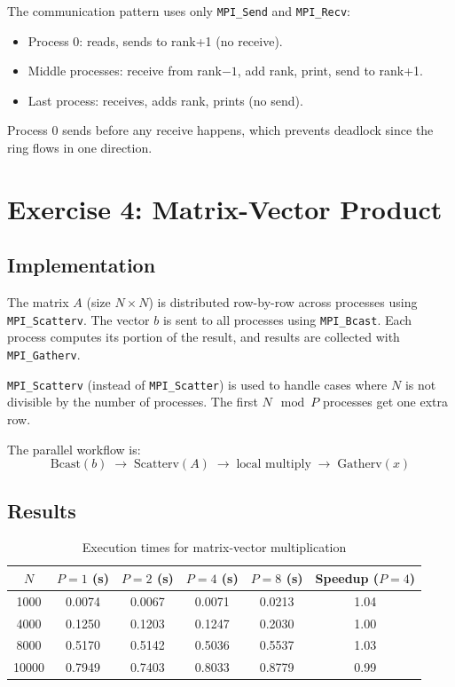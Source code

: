 \documentclass[11pt,a4paper]{article}
\begin{document}
The communication pattern uses only \texttt{MPI\_Send} and \texttt{MPI\_Recv}:
\begin{itemize}
    \item Process 0: reads, sends to rank+1 (no receive).
    \item Middle processes: receive from rank$-1$, add rank, print, send to rank+1.
    \item Last process: receives, adds rank, prints (no send).
\end{itemize}

Process 0 sends before any receive happens, which prevents deadlock since the ring flows in one direction.

\section{Exercise 4: Matrix-Vector Product}

\subsection{Implementation}

The matrix $A$ (size $N \times N$) is distributed row-by-row across processes using \texttt{MPI\_Scatterv}. The vector $b$ is sent to all processes using \texttt{MPI\_Bcast}. Each process computes its portion of the result, and results are collected with \texttt{MPI\_Gatherv}.

\texttt{MPI\_Scatterv} (instead of \texttt{MPI\_Scatter}) is used to handle cases where $N$ is not divisible by the number of processes. The first $N \mod P$ processes get one extra row.

The parallel workflow is:
\[
\text{Bcast}(b) \;\rightarrow\; \text{Scatterv}(A) \;\rightarrow\; \text{local multiply} \;\rightarrow\; \text{Gatherv}(x)
\]

\subsection{Results}

\begin{table}[h]
\centering
\begin{tabular}{cccccc}
\toprule
$N$ & $P=1$ (s) & $P=2$ (s) & $P=4$ (s) & $P=8$ (s) & Speedup ($P=4$) \\
\midrule
1000  & 0.0074 & 0.0067 & 0.0071 & 0.0213 & 1.04 \\
4000  & 0.1250 & 0.1203 & 0.1247 & 0.2030 & 1.00 \\
8000  & 0.5170 & 0.5142 & 0.5036 & 0.5537 & 1.03 \\
10000 & 0.7949 & 0.7403 & 0.8033 & 0.8779 & 0.99 \\
\bottomrule
\end{tabular}
\caption{Execution times for matrix-vector multiplication}
\end{table}
\end{document}
